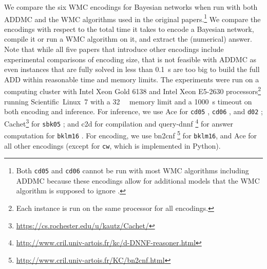 We compare the six WMC encodings for Bayesian networks when run with both
\textsf{ADDMC} \citep{DBLP:conf/aaai/DudekPV20} and the WMC algorithms used in
the original papers.\footnote{Both \texttt{cd05} and \texttt{cd06} cannot be run
  with most WMC algorithms including \textsf{ADDMC} because these encodings
  allow for additional models that the WMC algorithm is supposed to ignore
  \citep{DBLP:conf/ijcai/ChaviraD05,DBLP:conf/sat/ChaviraD06}.} We compare the
encodings with respect to the total time it takes to encode a Bayesian network,
compile it or run a WMC algorithm on it, and extract the (numerical) answer.
Note that while all five papers that introduce other encodings include
experimental comparisons of encoding size, that is not feasible with
\textsf{ADDMC} as even instances that are fully solved in less than
\SI{0.1}{\second} are too big to build the full ADD within reasonable time and
memory limits. The experiments were run on a computing cluster with Intel Xeon
Gold 6138 and Intel Xeon E5-2630 processors\footnote{Each instance is run on the
  same processor for all encodings.} running Scientific~Linux~7 with a
\SI{32}{\gibi\byte} memory limit and a \SI{1000}{\second} timeout on both
encoding and inference. For inference, we use \textsf{Ace} for \texttt{cd05}
\citep{DBLP:conf/ijcai/ChaviraD05}, \texttt{cd06}
\citep{DBLP:conf/sat/ChaviraD06}, and \texttt{d02}
\citep{DBLP:conf/kr/Darwiche02};
\textsf{Cachet}\footnote{\url{https://cs.rochester.edu/u/kautz/Cachet/}}
\citep{DBLP:conf/sat/SangBBKP04} for \texttt{sbk05}
\citep{DBLP:conf/aaai/SangBK05}; and \textsf{c2d}
\citep{DBLP:conf/ecai/Darwiche04} for compilation and \textsf{query-dnnf}
\footnote{\url{http://www.cril.univ-artois.fr/kc/d-DNNF-reasoner.html}} for
answer computation for \texttt{bklm16} \citep{DBLP:conf/ecai/BartKLM16}. For
encoding, we use \textsf{bn2cnf}
\footnote{\url{http://www.cril.univ-artois.fr/KC/bn2cnf.html}} for
\texttt{bklm16}, and \textsf{Ace} for all other encodings (except for
\texttt{cw}, which is implemented in Python).

